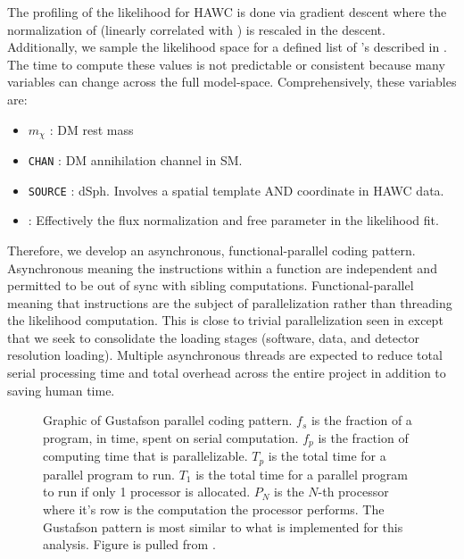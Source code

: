 The profiling of the likelihood for HAWC is done via gradient descent where the normalization of  (linearly correlated with \sv) is rescaled in the descent.
Additionally, we sample the likelihood space for a defined list of \sv's described in .
The time to compute these values is not predictable or consistent because many variables can change across the full model-space.
Comprehensively, these variables are:
\begin{itemize}
    \item $m_\chi$ : DM rest mass
    \item \texttt{CHAN} : DM annihilation channel in SM.
    \item \texttt{SOURCE} : dSph. Involves a spatial template AND coordinate in HAWC data.
    \item \sv: Effectively the flux normalization and free parameter in the likelihood fit.
\end{itemize}
Therefore, we develop an asynchronous, functional-parallel coding pattern.
Asynchronous meaning the instructions within a function are independent and permitted to be out of sync with sibling computations.
Functional-parallel meaning that instructions are the subject of parallelization rather than threading the likelihood computation.
This is close to trivial parallelization seen in  except that we seek to consolidate the loading stages (software, data, and detector resolution loading).
Multiple asynchronous threads are expected to reduce total serial processing time and total overhead across the entire project in addition to saving human time.

\begin{figure}[h]
    \caption{Graphic of Gustafson parallel coding pattern. $f_s$ is the fraction of a program, in time, spent on serial computation. $f_p$ is the fraction of computing time that is parallelizable. $T_p$ is the total time for a parallel program to run. $T_1$ is the total time for a parallel program to run if only 1 processor is allocated. $P_N$ is the $N$-th processor where it's row is the computation the processor performs. The Gustafson pattern is most similar to what is implemented for this analysis. Figure is pulled from \cite{ArtofHPC}.}
    \label{fig:mtd_gufsta}
\end{figure}

